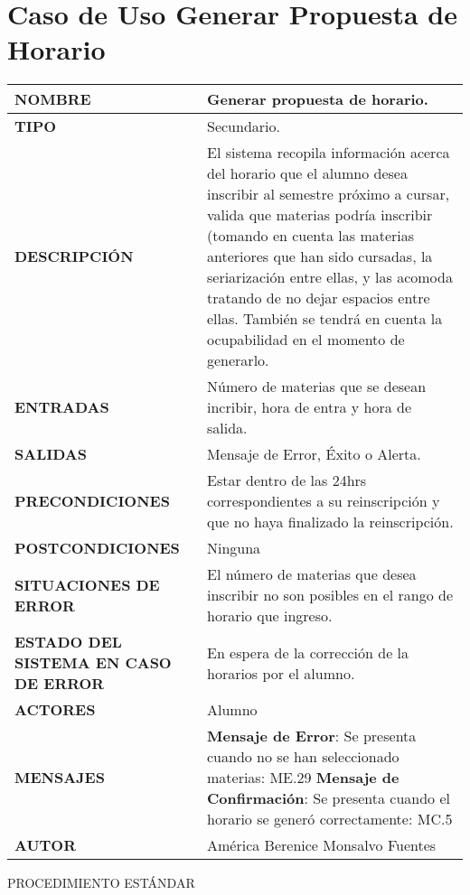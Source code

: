 \newpage
\section{Caso de Uso Generar Propuesta de Horario}
\begin{longtable}{ | p{6cm} | p{10cm} |}
	\hline
	\textbf{NOMBRE} & Generar propuesta de horario.\\
	\hline
	\textbf{TIPO} & Secundario.\\
	\hline
	\textbf{DESCRIPCIÓN}
	&
	El sistema recopila información acerca del horario que el alumno desea inscribir al semestre próximo a cursar, valida que materias podría inscribir (tomando en cuenta las materias anteriores que han sido cursadas, la seriarización entre ellas, y las acomoda tratando de no dejar espacios entre ellas. También se tendrá en cuenta la ocupabilidad en el momento de generarlo.\\
	\hline
	\textbf{ENTRADAS} & Número de materias que se desean incribir, hora de entra y hora de salida.\\
	\hline
	\textbf{SALIDAS} & Mensaje de Error, Éxito o Alerta.\\
	\hline
	\textbf{PRECONDICIONES}
	&
	Estar dentro de las 24hrs correspondientes a su reinscripción y que no haya finalizado la reinscripción.\\
	\hline
	\textbf{POSTCONDICIONES} & Ninguna\\
	\hline
	\textbf{SITUACIONES DE ERROR}
	&
	El número de materias que desea inscribir no son posibles en el rango de horario que ingreso.\\
	\hline
	\textbf{ESTADO DEL SISTEMA EN CASO DE ERROR} & En espera de la corrección de la horarios por el alumno.\\
	\hline
	\textbf{ACTORES} & Alumno\\
	\hline
	\textbf{MENSAJES}
	&
	\textbf{Mensaje de Error}: Se presenta cuando no se han seleccionado materias: ME.29 \newline
	\textbf{Mensaje de Confirmación}: Se presenta cuando el horario se generó correctamente: MC.5\\
	\hline
	\textbf{AUTOR} & América Berenice Monsalvo Fuentes\\
	\hline
\end{longtable}
\newpage
\Large{PROCEDIMIENTO ESTÁNDAR}
\large{}
